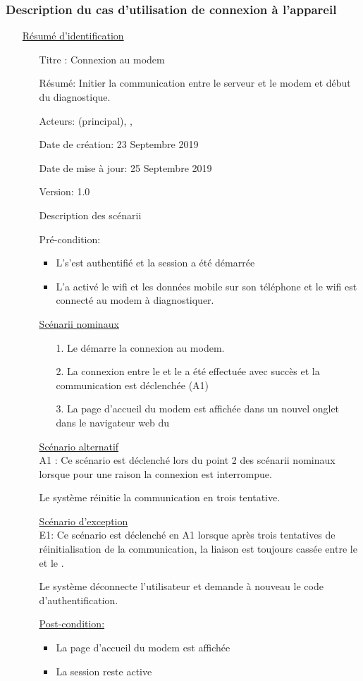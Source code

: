 \subsubsection*{Description du cas d'utilisation de connexion à l'appareil}
\begin{enumerate}
	\item[]\underline{Résumé d'identification}
		\begin{itemize}
			\item[]Titre : Connexion au modem
			\item[]Résumé: Initier la communication entre le serveur et le modem et début du diagnostique.
			\item[]Acteurs: \hd (principal), \md, \sv
			\item[]Date de création: 23 Septembre 2019
			\item[]Date de mise à jour: 25 Septembre 2019
			\item[]Version: 1.0
			\item[]Description des scénarii
			\item[]Pré-condition:
			\begin{itemize}
				\item L'\ut s'est authentifié et la session a été démarrée
				\item L'\ut a activé le wifi et les données mobile sur son téléphone et le wifi est connecté au modem à diagnostiquer. 
			\end{itemize}
			\item[]\underline{Scénarii nominaux}
			\begin{enumerate}
				\item[1.] Le \hd démarre la connexion au modem.
				\item[2.] La connexion entre le \sv et le  \md a été effectuée avec succès et la communication est déclenchée (A1)
				\item[3.] La page d'accueil du modem est affichée dans un nouvel onglet dans le navigateur web du \hd
			\end{enumerate}
			\item[]\underline{Scénario alternatif}\\
			A1 : Ce scénario est déclenché lors du point 2 des scénarii nominaux lorsque pour une raison la connexion est interrompue.
			
			Le système réinitie la communication en trois tentative.
			\item[]\underline{Scénario d'exception}\\
			E1: Ce scénario est déclenché en A1 lorsque après trois tentatives de réinitialisation de la communication, la liaison est toujours cassée entre le \md et le \sv.
			
			Le système déconnecte l'utilisateur et demande à nouveau le code d'authentification.
			
			\item[]\underline{Post-condition:}
			\begin{itemize}
				\item La page d'accueil du modem est affichée
				\item La session reste active
			\end{itemize}
		\end{itemize}
\end{enumerate}
